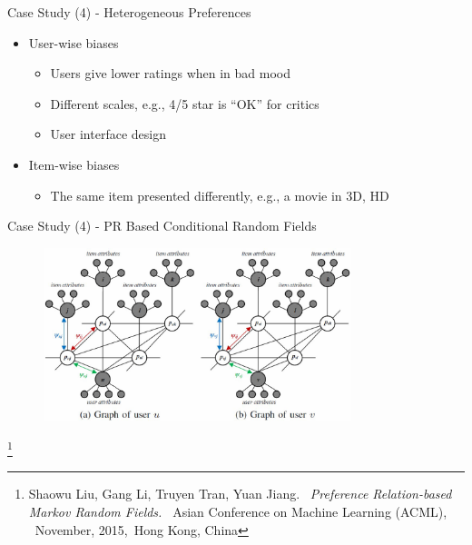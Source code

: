 \documentclass[
 size=14pt,
 paper=smartboard,  %
 mode=present, 		%
 display=slides, 	%
 style=tuliplab,  	%
 pauseslide,
 fleqn,leqno]{powerdot}
\begin{document}
\begin{slide}[toc=,bm=]{Case Study (4) - Heterogeneous Preferences}

\begin{itemize}
\item
User-wise biases

\begin{itemize}
\item
Users give lower ratings when in bad mood

\item
Different scales, e.g., 4/5 star is ``OK'' for critics

\item
User interface design

\end{itemize}

\item
Item-wise biases

\begin{itemize}
\item
The same item presented differently,
e.g., a movie in 3D, HD

\end{itemize}
\end{itemize}
\end{slide}


\begin{slide}[toc=,bm=]{Case Study (4) - PR Based Conditional Random Fields}

\begin{figure}
	\includegraphics[width=0.8\textwidth]{figures//theme3//Theme3_5_1.eps}
\end{figure}

\footnote{Shaowu Liu, Gang Li, Truyen Tran, Yuan Jiang. 
\emph{Preference Relation-based Markov Random Fields. }
Asian Conference on Machine Learning (ACML),  November, 2015, Hong Kong, China}

\end{slide}
\end{document}
